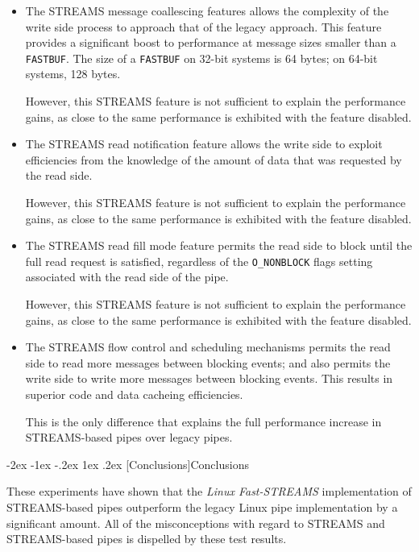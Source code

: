 \documentclass[letterpaper,final,notitlepage,twocolumn,10pt,twoside]{article}
\makeatletter
\let\large\normalsize
\let\normalsize\small
\let\small\footnotesize
\let\footnotesize\scriptsize
\let\scriptsize\tiny
\renewcommand\section{\@startsection {section}{1}{\z@}%
                                   {-2ex \@plus -1ex \@minus -.2ex}%
                                   {1ex \@plus .2ex}%
                                   {\normalfont\large\bfseries}}
\makeatother
\begin{document}
\begin{itemize}

\item The STREAMS message coallescing features allows the complexity of the
write side process to approach that of the legacy approach.  This feature
provides a significant boost to performance at message sizes smaller than a
\texttt{FASTBUF}.  The size of a \texttt{FASTBUF} on 32-bit systems is 64
bytes; on 64-bit systems, 128 bytes.

However, this STREAMS feature is not sufficient to explain the performance
gains, as close to the same performance is exhibited with the feature
disabled.

\item The STREAMS read notification feature allows the write side to exploit
efficiencies from the knowledge of the amount of data that was requested by
the read side.

However, this STREAMS feature is not sufficient to explain the performance
gains, as close to the same performance is exhibited with the feature
disabled.

\item The STREAMS read fill mode feature permits the read side to block until
the full read request is satisfied, regardless of the \texttt{O\_NONBLOCK}
flags setting associated with the read side of the pipe.

However, this STREAMS feature is not sufficient to explain the performance
gains, as close to the same performance is exhibited with the feature
disabled.

\item The STREAMS flow control and scheduling mechanisms permits the read side
to read more messages between blocking events; and also permits the write side
to write more messages between blocking events.  This results in superior code
and data cacheing efficiencies.

This is the only difference that explains the full performance increase in
STREAMS-based pipes over legacy pipes.

\end{itemize}

\section[Conclusions]{Conclusions}

These experiments have shown that the \textsl{Linux Fast-STREAMS}
implementation of STREAMS-based pipes outperform the legacy Linux pipe
implementation by a significant amount.  All of the misconceptions with regard
to STREAMS and STREAMS-based pipes is dispelled by these test results.
\end{document}
